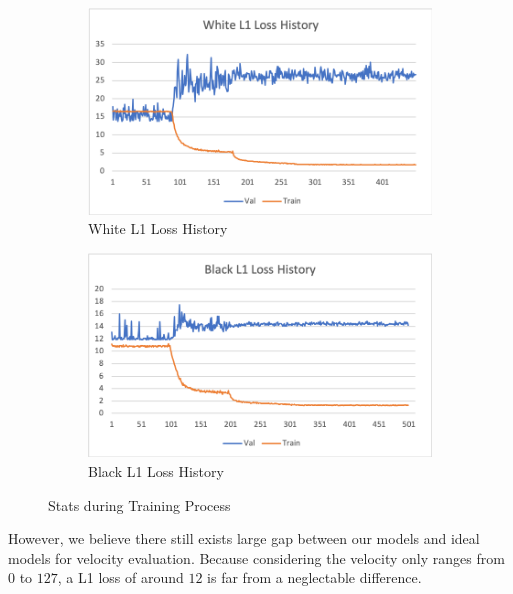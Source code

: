 \documentclass[10pt,twocolumn,letterpaper]{article}
\begin{document}
\begin{figure}[h!]
   \begin{subfigure}{0.5\textwidth}
      \centering
      \includegraphics[width=\linewidth]{fig/vel_1.png}
      \caption{White L1 Loss History} \label{fig:k}
    \end{subfigure}\hspace*{\fill}
    \newline \newline
    \begin{subfigure}{0.5\textwidth}
      \centering
      \includegraphics[width=\linewidth]{fig/vel_3.png}
      \caption{Black L1 Loss History} \label{fig:k}
    \end{subfigure}\hspace*{\fill}
   \caption{Stats during Training Process} \label{fig:4}
\end{figure}   

However, we believe there still exists large gap between our models and ideal models for velocity evaluation. Because considering the velocity only ranges from \(0\) to \(127\), a L1 loss of around \(12\) is far from a neglectable difference.
\end{document}
